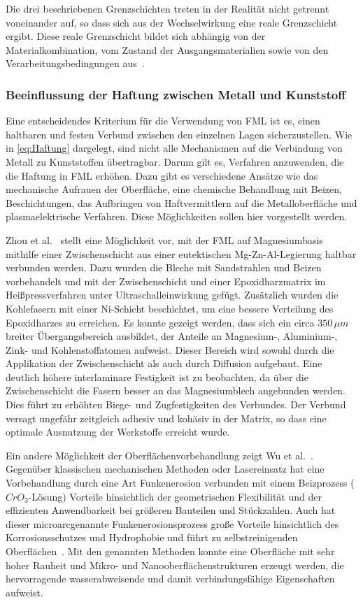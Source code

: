 Die drei beschriebenen Grenzschichten treten in der Realität nicht getrennt voneinander auf, so dass sich aus der Wechselwirkung eine reale Grenzschicht ergibt.
Diese reale Grenzschicht bildet sich abhängig von der Materialkombination, vom Zustand der Ausgangsmaterialien sowie von den Verarbeitungsbedingungen aus~\cite{Flock.b}.

\subsubsection{Beeinflussung der Haftung zwischen Metall und Kunststoff}\label{subsubsec:beeinflussung}

Eine entscheidendes Kriterium für die Verwendung von FML ist es, einen haltbaren und festen Verbund zwischen den einzelnen Lagen sicherzustellen.
Wie in \autoref{eq:Haftung} dargelegt, sind nicht alle Mechanismen auf die Verbindung von Metall zu Kunststoffen übertragbar.
Darum gilt es, Verfahren anzuwenden, die die Haftung in FML erhöhen.
Dazu gibt es verschiedene Ansätze wie das mechanische Aufrauen der Oberfläche, eine chemische Behandlung mit Beizen, Beschichtungen, das Aufbringen von Haftvermittlern auf die Metalloberfläche und plasmaelektrische Verfahren.
Diese Möglichkeiten sollen hier vorgestellt werden.

Zhou et al.~\cite{Zhou.2021} stellt eine Möglichkeit vor, mit der FML auf Magnesiumbasis mithilfe einer Zwischenschicht aus einer eutektischen Mg-Zn-Al-Legierung haltbar verbunden werden.
Dazu wurden die Bleche mit Sandstrahlen und Beizen vorbehandelt und mit der Zwischenschicht und einer Epoxidharzmatrix im Heißpressverfahren unter Ultraschalleinwirkung gefügt.
Zusätzlich wurden die Kohlefasern mit einer Ni-Schicht beschichtet, um eine bessere Verteilung des Epoxidharzes zu erreichen.
Es konnte gezeigt werden, dass sich ein circa $350 \, \mu m$ breiter Übergangsbereich ausbildet, der Anteile an Magnesium-, Aluminium-, Zink- und Kohlenstoffatomen aufweist.
Dieser Bereich wird sowohl durch die Applikation der Zwischenschicht als auch durch Diffusion aufgebaut.
Eine deutlich höhere interlaminare Festigkeit ist zu beobachten, da über die Zwischenschicht die Fasern besser an das Magnesiumblech angebunden werden.
Dies führt zu erhöhten Biege- und Zugfestigkeiten des Verbundes.
Der Verbund versagt ungefähr zeitgleich adhesiv und kohäsiv in der Matrix, so dass eine optimale Ausnutzung der Werkstoffe erreicht wurde.

Ein andere Möglichkeit der Oberflächenvorbehandlung zeigt Wu et al.~\cite{Wu.2016}.
Gegenüber klassischen mechanischen Methoden oder Lasereinsatz hat eine Vorbehandlung durch eine Art Funkenerosion verbunden mit einem Beizprozess ($CrO_3$-Lösung) Vorteile hinsichtlich der geometrischen Flexibilität und der effizienten Anwendbarkeit bei größeren Bauteilen und Stückzahlen.
Auch hat dieser \glqq microarc\grqq genannte Funkenerosionsprozess große Vorteile hinsichtlich des Korrosionsschutzes und Hydrophobie und führt zu selbstreinigenden Oberflächen~\cite{Lu.2015}.
Mit den genannten Methoden konnte eine Oberfläche mit sehr hoher Rauheit und Mikro- und Nanooberflächenstrukturen erzeugt werden, die hervorragende wasserabweisende und damit verbindungsfähige Eigenschaften aufweist.

